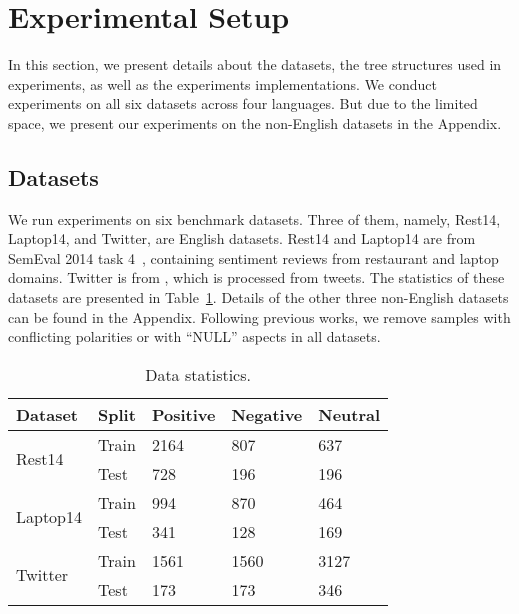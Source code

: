 \documentclass[11pt]{article}
\begin{document}
\section{Experimental Setup}
\label{sec:exp}
In this section, we present details about the datasets, the tree structures used in experiments, as well as the experiments implementations. We conduct experiments  on all six datasets across four languages. But due to the limited space, we present our experiments on the non-English datasets in the Appendix.


\subsection{Datasets}
\label{sec:data}
We run experiments on six benchmark datasets. Three of them, namely, Rest14, Laptop14, and Twitter, are English datasets. Rest14 and Laptop14 are from SemEval 2014 task 4~\citep{DBLP:conf/semeval/PontikiGPPAM14}, containing sentiment reviews from restaurant and laptop domains. Twitter is from \citet{DBLP:conf/acl/DongWTTZX14}, which is processed from tweets.  The statistics of these datasets are presented in Table~\ref{tb:data}. Details of the other three non-English datasets can be found in the Appendix. Following previous works, we remove samples with conflicting polarities or with ``NULL'' aspects in all datasets.



\begin{table}[]
  \centering\small
  \setlength\tabcolsep{1pt}
  \begin{tabular}{m{2.1cm}m{1.1cm}<{\centering}m{1.4cm}<{\centering}m{1.5cm}<{\centering}m{1.4cm}<{\centering}}
    \toprule
    \textbf{Dataset}          & \textbf{Split} & \textbf{Positive} & \textbf{Negative} & \textbf{Neutral} \\\midrule
    \multirow{2}{*}{Rest14}   & Train          & 2164              & 807               & 637              \\
                              & Test           & 728               & 196               & 196              \\ \midrule
    \multirow{2}{*}{Laptop14} & Train          & 994               & 870               & 464              \\
                              & Test           & 341               & 128               & 169              \\\midrule
    \multirow{2}{*}{Twitter}  & Train          & 1561              & 1560              & 3127             \\
                              & Test           & 173               & 173               & 346              \\
\bottomrule
  \end{tabular}\caption{Data statistics.}
  \label{tb:data}
\end{table}
\end{document}
